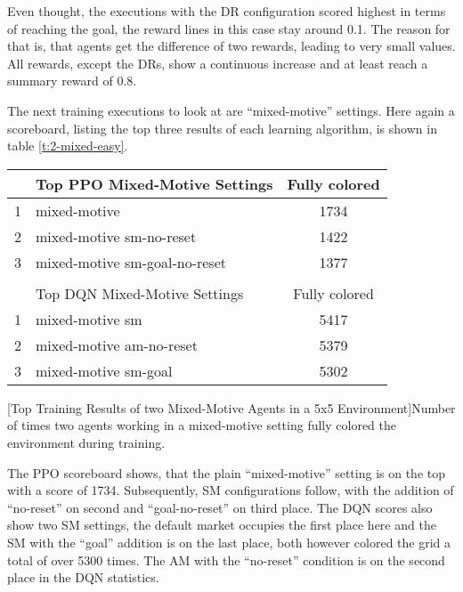 Even thought, the executions with the DR configuration scored highest in terms of reaching the goal, the reward lines in this case stay around 0.1. The reason for that is, that agents get the difference of two rewards, leading to very small values. All rewards, except the DRs, show a continuous increase and at least reach a summary reward of 0.8. 

The next training executions to look at are ``mixed-motive'' settings. Here again a scoreboard, listing the top three results of each learning algorithm, is shown in table \ref{t:2-mixed-easy}.
\begin{center}
    \begin{tabular}{clc}\hline
         & Top PPO Mixed-Motive Settings & Fully colored \\ \hline
        {\small 1} & mixed-motive & 1734 \\
        {\small 2} & mixed-motive sm-no-reset & 1422 \\
        {\small 3} & mixed-motive sm-goal-no-reset & 1377 \\ \hline
         &   \\ \hline
         & Top DQN Mixed-Motive Settings & Fully colored \\ \hline
        {\small 1} & mixed-motive sm & 5417 \\
        {\small 2} & mixed-motive am-no-reset & 5379 \\
        {\small 3} & mixed-motive sm-goal & 5302 \\ \hline
        \end{tabular}
        [Top Training Results of two Mixed-Motive Agents in a 5x5 Environment]{Number of times two agents working in a mixed-motive setting fully colored the environment during training.}\label{t:2-mixed-easy}
    \end{center}

The PPO scoreboard shows, that the plain ``mixed-motive'' setting is on the top with a score of 1734. Subsequently, SM configurations follow, with the addition of ``no-reset'' on second and ``goal-no-reset'' on third place. The DQN scores also show two SM settings, the default market occupies the first place here and the SM with the ``goal'' addition is on the last place, both however colored the grid a total of over 5300 times. The AM with the ``no-reset'' condition is on the second place in the DQN statistics.

